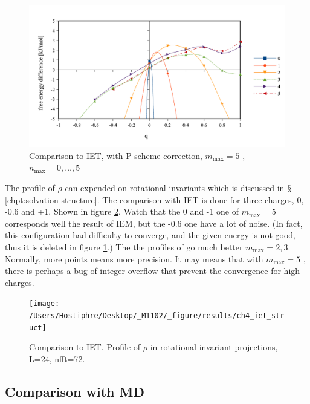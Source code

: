 \begin{figure}[H]
\begin{centering}
\includegraphics[bb=0bp 20bp 510bp 263bp,scale=0.6]{_figure/results/ch4_diff_mmax5}
\par\end{centering}
\caption{Comparison to IET, with P-scheme correction, $m_{\max}=5$ , $n_{\max}=0,\ldots,5$
\label{fig:Comparison-to-IET,nmax0-5}}
\end{figure}

The profile of $\rho$ can expended on rotational invariants which
is discussed in $\mathsection$\ref{chpt:solvation-structure}. The
comparison with IET is done for three charges, 0, -0.6 and +1. Shown
in figure \ref{fig:Comparison-to-IET.rot_invar}. Watch that the 0
and -1 one of $m_{\max}=5$ corresponds well the result of IEM, but
the -0.6 one have a lot of noise. (In fact, this configuration had
difficulty to converge, and the given energy is not good, thus it
is deleted in figure \ref{fig:Comparison-to-IET,nmax0-5}.) The the
profiles of go much better $m_{\max}=2,3$. Normally, more points
means more precision. It may means that with $m_{\max}=5$ , there
is perhaps a bug of integer overflow that prevent the convergence
for high charges.

\begin{figure}[H]
\begin{centering}
\texttt{[image: /Users/Hostiphre/Desktop/\_M1102/\_figure/results/ch4\_iet\_struct]}
\par\end{centering}
\caption{Comparison to IET. Profile of $\rho$ in rotational invariant projections,
L=24, nfft=72.\label{fig:Comparison-to-IET.rot_invar}}
\end{figure}


\subsection{Comparison with MD}

